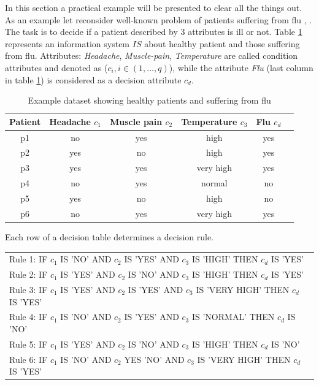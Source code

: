 In this section a practical example will be presented to clear all the things
out. As an example let reconsider well-known problem of patients suffering from
flu \cite{bib39}, \cite{bib40}. The task is to decide if a patient described by 3 attributes is ill or not. Table \ref{tab:example_rough_set} 
represents an information system $IS$ about healthy patient and those suffering
from flu. Attributes: \textit{Headache}, \textit{Muscle-pain},
\textit{Temperature} are called condition attributes and denoted as ($c_i,i \in (1, \ldots, q)$),
while the attribute \textit{Flu} (last column in table \ref{tab:example_rough_set}) is considered as
a decision attribute $c_d$.
\begin{table}[H] 
    \centering
    \caption{Example dataset showing healthy patients and suffering from flu}
    \begin{tabular}{|c|c|c|c|c|c|}
        \hline 
    Patient & Headache $c_1$& Muscle pain $c_2$& Temperature $c_3$& Flu $c_d$\\ \hline \hline
    p1 & no & yes & high & yes \\ \hline
    p2 & yes & no & high & yes \\ \hline
    p3 & yes & yes & very high & yes \\ \hline
    p4 & no & yes & normal & no \\ \hline
    p5 & yes & no & high & no \\ \hline
    p6 & no & yes & very high & yes \\ \hline    
    \end{tabular}
    \label{tab:example_rough_set}
\end{table}
Each row of a decision table determines a decision rule. 


\begin{tabular}[H]{l}
    Rule 1:  IF $c_1$ IS 'NO' AND $c_2$ IS 'YES' AND $c_3$ IS 'HIGH' THEN $c_d$
    IS 'YES' \\
    Rule 2:  IF $c_1$ IS 'YES' AND $c_2$ IS 'NO' AND $c_3$ IS 'HIGH' THEN $c_d$
    IS 'YES' \\
    Rule 3:  IF $c_1$ IS 'YES' AND $c_2$ IS 'YES' AND $c_3$ IS 'VERY HIGH' THEN
    $c_d$ IS 'YES' \\
    Rule 4:  IF $c_1$ IS 'NO' AND $c_2$ IS 'YES' AND $c_3$ IS 'NORMAL' THEN
    $c_d$ IS 'NO' \\
    Rule 5:  IF $c_1$ IS 'YES' AND $c_2$ IS 'NO' AND $c_3$ IS 'HIGH' THEN $c_d$
    IS 'NO' \\
    Rule 6:  IF $c_1$ IS 'NO' AND $c_2$ YES 'NO' AND $c_3$ IS 'VERY HIGH' THEN
    $c_d$ IS 'YES'  
\end{tabular}


